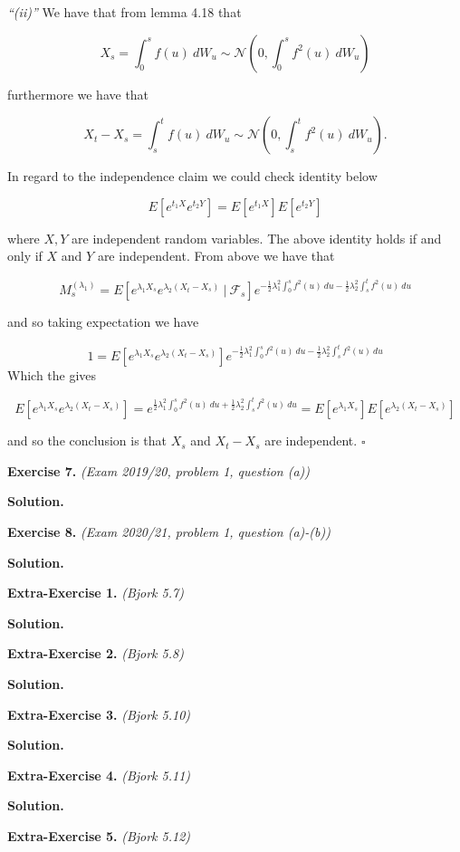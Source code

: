\documentclass[a4paper,12pt,openany]{book}
\begin{document}
\emph{``(ii)''} We have that from lemma 4.18 that

\[
X_s=\int_0^sf(u)\ dW_u\sim \mathcal{N}\left(0,\int_0^sf^2(u)\ dW_u\right)
\]

furthermore we have that

\[
X_t-X_s=\int_s^tf(u)\ dW_u\sim \mathcal{N}\left(0,\int_s^tf^2(u)\ dW_u\right).
\]

In regard to the independence claim we could check identity below

\[
E[e^{t_1X}e^{t_2 Y}]=E[e^{t_1X}]E[e^{t_2Y}]
\]

where \(X,Y\) are independent random variables. The above identity holds if and only if \(X\) and \(Y\) are independent. From above we have that

\[
M_s^{(\lambda_1)}=E[e^{\lambda_1X_s}e^{\lambda_2(X_t-X_s)}\ \vert\ \mathcal{F}_s]e^{-\frac{1}{2}\lambda_1^2\int_0^s f^2(u)\ du-\frac{1}{2}\lambda_2^2\int_s^t f^2(u)\ du}
\]

and so taking expectation we have

\[
1=E[e^{\lambda_1X_s}e^{\lambda_2(X_t-X_s)}]e^{-\frac{1}{2}\lambda_1^2\int_0^s f^2(u)\ du-\frac{1}{2}\lambda_2^2\int_s^t f^2(u)\ du}
\]
Which the gives

\[
E[e^{\lambda_1X_s}e^{\lambda_2(X_t-X_s)}]=e^{\frac{1}{2}\lambda_1^2\int_0^s f^2(u)\ du+\frac{1}{2}\lambda_2^2\int_s^t f^2(u)\ du}=E[e^{\lambda_1X_s}]E[e^{\lambda_2(X_t-X_s)}]
\]

and so the conclusion is that \(X_s\) and \(X_t-X_s\) are independent. \(\square\)

\textbf{Exercise 7.} \emph{(Exam 2019/20, problem 1, question (a))}

\textbf{Solution.}

\textbf{Exercise 8.} \emph{(Exam 2020/21, problem 1, question (a)-(b))}

\textbf{Solution.}

\textbf{Extra-Exercise 1.} \emph{(Bjork 5.7)}

\textbf{Solution.}

\textbf{Extra-Exercise 2.} \emph{(Bjork 5.8)}

\textbf{Solution.}

\textbf{Extra-Exercise 3.} \emph{(Bjork 5.10)}

\textbf{Solution.}

\textbf{Extra-Exercise 4.} \emph{(Bjork 5.11)}

\textbf{Solution.}

\textbf{Extra-Exercise 5.} \emph{(Bjork 5.12)}
\end{document}
